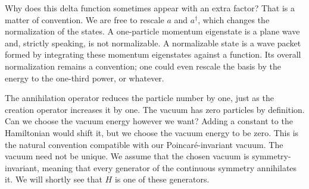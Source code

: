 Why does this delta function sometimes appear with an extra factor? That is a
matter of convention. We are free to rescale $a$ and $a^\dagger$, which changes
the normalization of the states. A
one-particle momentum eigenstate is a plane wave and, strictly speaking, is not
normalizable. A normalizable state is a wave packet formed by integrating these
momentum eigenstates
against a function. Its overall normalization remains a convention; one could
even rescale the basis by the energy to the one-third power, or whatever.

The annihilation operator reduces the particle number by one, just as the
creation operator increases it by one. The vacuum has zero particles by
definition.
Can we choose the vacuum energy however we want? Adding a constant to the
Hamiltonian would shift it, but we choose the vacuum energy to be zero. This is
the natural convention compatible with our Poincaré-invariant vacuum.
The vacuum need not be unique. We assume that the chosen vacuum is
symmetry-invariant, meaning that every generator of the continuous symmetry
annihilates it. We will shortly see that $H$ is one of these generators.

